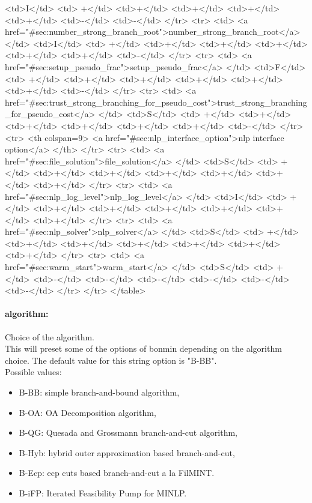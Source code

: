 {{<td>I</td>
<td> +</td>
<td>+</td>
<td>+</td>
<td>+</td>
<td>+</td>
<td>-</td>
<td>-</td>
</tr>
<tr>
<td> <a href="#sec:number_strong_branch_root">number_strong_branch_root</a> </td>
<td>I</td>
<td> +</td>
<td>+</td>
<td>+</td>
<td>+</td>
<td>+</td>
<td>+</td>
<td>-</td>
</tr>
<tr>
<td> <a href="#sec:setup_pseudo_frac">setup_pseudo_frac</a> </td>
<td>F</td>
<td> +</td>
<td>+</td>
<td>+</td>
<td>+</td>
<td>+</td>
<td>+</td>
<td>-</td>
</tr>
<tr>
<td> <a href="#sec:trust_strong_branching_for_pseudo_cost">trust_strong_branching_for_pseudo_cost</a> </td>
<td>S</td>
<td> +</td>
<td>+</td>
<td>+</td>
<td>+</td>
<td>+</td>
<td>+</td>
<td>-</td>
</tr>
<tr>   <th colspan=9> <a href="#sec:nlp_interface_option">nlp interface option</a> </th>
</tr>
<tr>
<td> <a href="#sec:file_solution">file_solution</a> </td>
<td>S</td>
<td> +</td>
<td>+</td>
<td>+</td>
<td>+</td>
<td>+</td>
<td>+</td>
<td>+</td>
</tr>
<tr>
<td> <a href="#sec:nlp_log_level">nlp_log_level</a> </td>
<td>I</td>
<td> +</td>
<td>+</td>
<td>+</td>
<td>+</td>
<td>+</td>
<td>+</td>
<td>+</td>
</tr>
<tr>
<td> <a href="#sec:nlp_solver">nlp_solver</a> </td>
<td>S</td>
<td> +</td>
<td>+</td>
<td>+</td>
<td>+</td>
<td>+</td>
<td>+</td>
<td>+</td>
</tr>
<tr>
<td> <a href="#sec:warm_start">warm_start</a> </td>
<td>S</td>
<td> +</td>
<td>-</td>
<td>-</td>
<td>-</td>
<td>-</td>
<td>-</td>
<td>-</td>
</tr>
</tr>
</table>
}
}
\paragraph{algorithm:}\label{sec:algorithm} Choice of the algorithm. $\;$ \\
 This will preset some of the options of bonmin
depending on the algorithm choice.
The default value for this string option is "B-BB".
\\ 
Possible values:
\begin{itemize}
   \item B-BB: simple branch-and-bound algorithm,
   \item B-OA: OA Decomposition algorithm,
   \item B-QG: Quesada and Grossmann branch-and-cut algorithm,
   \item B-Hyb: hybrid outer approximation based branch-and-cut,
   \item B-Ecp: ecp cuts based branch-and-cut a la FilMINT.
   \item B-iFP: Iterated Feasibility Pump for MINLP.
\end{itemize}

